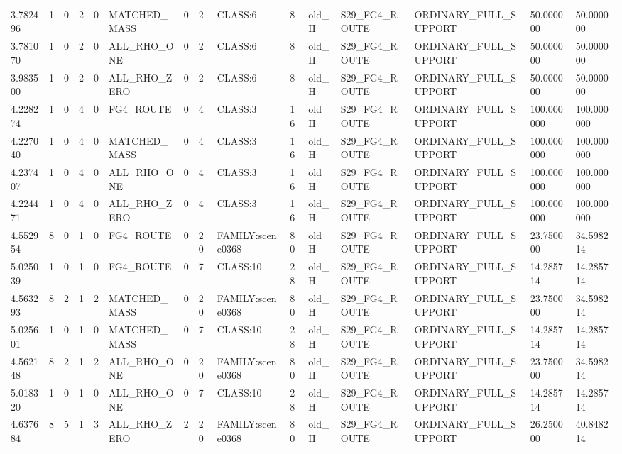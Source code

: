 \begin{tabular}{lllllllllllllll}
3.782496 & 1 & 0 & 2 & 0 & MATCHED\_MASS & 0 & 2 & CLASS:6 & 8 & old\_H & S29\_FG4\_ROUTE & ORDINARY\_FULL\_SUPPORT & 50.000000 & 50.000000 \\
3.781070 & 1 & 0 & 2 & 0 & ALL\_RHO\_ONE & 0 & 2 & CLASS:6 & 8 & old\_H & S29\_FG4\_ROUTE & ORDINARY\_FULL\_SUPPORT & 50.000000 & 50.000000 \\
3.983500 & 1 & 0 & 2 & 0 & ALL\_RHO\_ZERO & 0 & 2 & CLASS:6 & 8 & old\_H & S29\_FG4\_ROUTE & ORDINARY\_FULL\_SUPPORT & 50.000000 & 50.000000 \\
4.228274 & 1 & 0 & 4 & 0 & FG4\_ROUTE & 0 & 4 & CLASS:3 & 16 & old\_H & S29\_FG4\_ROUTE & ORDINARY\_FULL\_SUPPORT & 100.000000 & 100.000000 \\
4.227040 & 1 & 0 & 4 & 0 & MATCHED\_MASS & 0 & 4 & CLASS:3 & 16 & old\_H & S29\_FG4\_ROUTE & ORDINARY\_FULL\_SUPPORT & 100.000000 & 100.000000 \\
4.237407 & 1 & 0 & 4 & 0 & ALL\_RHO\_ONE & 0 & 4 & CLASS:3 & 16 & old\_H & S29\_FG4\_ROUTE & ORDINARY\_FULL\_SUPPORT & 100.000000 & 100.000000 \\
4.224471 & 1 & 0 & 4 & 0 & ALL\_RHO\_ZERO & 0 & 4 & CLASS:3 & 16 & old\_H & S29\_FG4\_ROUTE & ORDINARY\_FULL\_SUPPORT & 100.000000 & 100.000000 \\
4.552954 & 8 & 0 & 1 & 0 & FG4\_ROUTE & 0 & 20 & FAMILY:scene0368 & 80 & old\_H & S29\_FG4\_ROUTE & ORDINARY\_FULL\_SUPPORT & 23.750000 & 34.598214 \\
5.025039 & 1 & 0 & 1 & 0 & FG4\_ROUTE & 0 & 7 & CLASS:10 & 28 & old\_H & S29\_FG4\_ROUTE & ORDINARY\_FULL\_SUPPORT & 14.285714 & 14.285714 \\
4.563293 & 8 & 2 & 1 & 2 & MATCHED\_MASS & 0 & 20 & FAMILY:scene0368 & 80 & old\_H & S29\_FG4\_ROUTE & ORDINARY\_FULL\_SUPPORT & 23.750000 & 34.598214 \\
5.025601 & 1 & 0 & 1 & 0 & MATCHED\_MASS & 0 & 7 & CLASS:10 & 28 & old\_H & S29\_FG4\_ROUTE & ORDINARY\_FULL\_SUPPORT & 14.285714 & 14.285714 \\
4.562148 & 8 & 2 & 1 & 2 & ALL\_RHO\_ONE & 0 & 20 & FAMILY:scene0368 & 80 & old\_H & S29\_FG4\_ROUTE & ORDINARY\_FULL\_SUPPORT & 23.750000 & 34.598214 \\
5.018320 & 1 & 0 & 1 & 0 & ALL\_RHO\_ONE & 0 & 7 & CLASS:10 & 28 & old\_H & S29\_FG4\_ROUTE & ORDINARY\_FULL\_SUPPORT & 14.285714 & 14.285714 \\
4.637684 & 8 & 5 & 1 & 3 & ALL\_RHO\_ZERO & 2 & 20 & FAMILY:scene0368 & 80 & old\_H & S29\_FG4\_ROUTE & ORDINARY\_FULL\_SUPPORT & 26.250000 & 40.848214 \\

\end{tabular}
